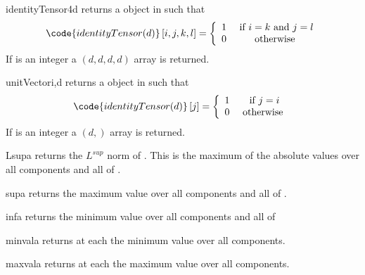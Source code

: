 \begin{funcdesc}{identityTensor4}{d}
returns a \RankFour \Data object in \FunctionSpace {} such that
\begin{equation}
\code{identityTensor(d)}\left[ i,j,k,l\right] = \left\{ 
\begin{array}{cc}
1 & \mbox{ if } i=k \mbox{ and } j=l\\
0 & \mbox{ otherwise }
\end{array}
\right.
\end{equation}
If  is an integer a $(d,d,d,d)$ \numarray array is returned.
\end{funcdesc}
\begin{funcdesc}{unitVector}{i,d}
returns a \RankOne \Data object in \FunctionSpace {} such that
\begin{equation}
\code{identityTensor(d)}\left[ j \right] = \left\{ 
\begin{array}{cc}
1 & \mbox{ if } j=i\\
0 & \mbox{ otherwise }
\end{array}
\right.
\end{equation}
If  is an integer a $(d,)$ \numarray array is returned.

\end{funcdesc}

\begin{funcdesc}{Lsup}{a}
returns the $L^{sup}$ norm of . This is the maximum of the absolute values
 over all components and all \DataSamplePoints of . 
\end{funcdesc}

\begin{funcdesc}{sup}{a}
returns the maximum value over all components and all \DataSamplePoints of .
\end{funcdesc}

\begin{funcdesc}{inf}{a}
returns the minimum value over all components and all \DataSamplePoints of 
\end{funcdesc}



\begin{funcdesc}{minval}{a}
returns at each \DataSamplePoints the minimum value over all components.
\end{funcdesc}

\begin{funcdesc}{maxval}{a}
returns at each \DataSamplePoints the maximum value over all components.
\end{funcdesc}

